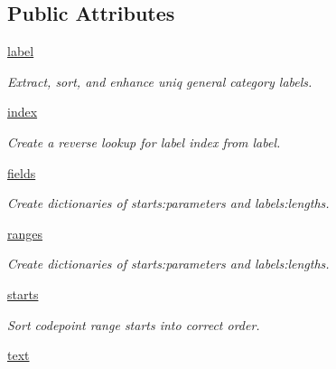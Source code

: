 \subsection*{Public Attributes}
\begin{DoxyCompactItemize}
\item 
\hyperlink{classc_1_1_classify_1_1_classify_a39504bd936bf5576befb10e0ac43d83f}{label}
\begin{DoxyCompactList}\small\item\em Extract, sort, and enhance uniq general category labels. \end{DoxyCompactList}\item 
\hypertarget{classc_1_1_classify_1_1_classify_a4f7fa627ce6c996d15b94b95fc308efd}{}\hyperlink{classc_1_1_classify_1_1_classify_a4f7fa627ce6c996d15b94b95fc308efd}{index}\label{classc_1_1_classify_1_1_classify_a4f7fa627ce6c996d15b94b95fc308efd}

\begin{DoxyCompactList}\small\item\em Create a reverse lookup for label index from label. \end{DoxyCompactList}\item 
\hyperlink{classc_1_1_classify_1_1_classify_ae16c6fab346508b48b720cd04e9ce7df}{fields}
\begin{DoxyCompactList}\small\item\em Create dictionaries of starts\+:parameters and labels\+:lengths. \end{DoxyCompactList}\item 
\hyperlink{classc_1_1_classify_1_1_classify_a1e4a9a02e19f108821677534f7e8d60a}{ranges}
\begin{DoxyCompactList}\small\item\em Create dictionaries of starts\+:parameters and labels\+:lengths. \end{DoxyCompactList}\item 
\hyperlink{classc_1_1_classify_1_1_classify_afdb329410c16ea92a7ac17476f576fde}{starts}
\begin{DoxyCompactList}\small\item\em Sort codepoint range starts into correct order. \end{DoxyCompactList}\item 
\hypertarget{classc_1_1_classify_1_1_classify_a301a21d13817bbbbf07d6af1226c244a}{}\hyperlink{classc_1_1_classify_1_1_classify_a301a21d13817bbbbf07d6af1226c244a}{text}\label{classc_1_1_classify_1_1_classify_a301a21d13817bbbbf07d6af1226c244a}


\end{DoxyCompactItemize}
